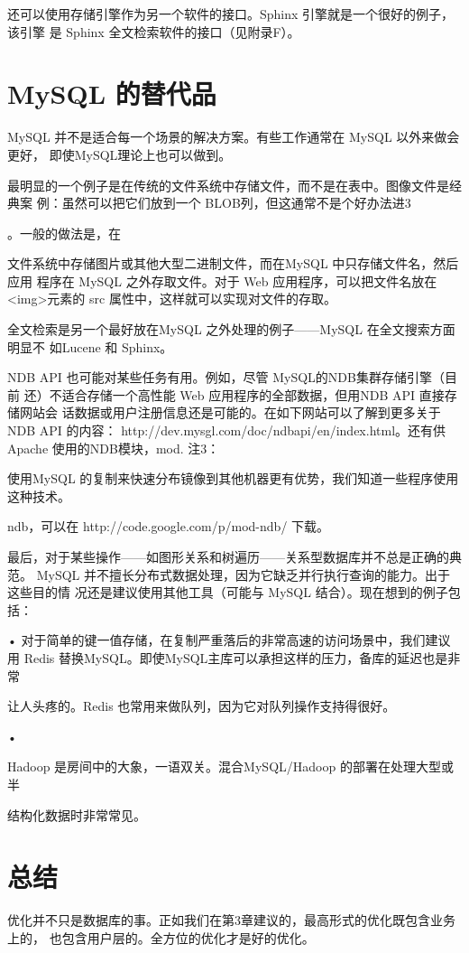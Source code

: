 还可以使用存储引擎作为另一个软件的接口。Sphinx 引擎就是一个很好的例子，该引擎
是 Sphinx 全文检索软件的接口（见附录F）。

\section{MySQL 的替代品}
MySQL 并不是适合每一个场景的解决方案。有些工作通常在 MySQL 以外来做会更好，
即使MySQL理论上也可以做到。

最明显的一个例子是在传统的文件系统中存储文件，而不是在表中。图像文件是经典案
例：虽然可以把它们放到一个 BLOB列，但这通常不是个好办法进3

。一般的做法是，在

文件系统中存储图片或其他大型二进制文件，而在MySQL 中只存储文件名，然后应用
程序在 MySQL 之外存取文件。对于 Web 应用程序，可以把文件名放在<img>元素的
src 属性中，这样就可以实现对文件的存取。

全文检索是另一个最好放在MySQL 之外处理的例子——MySQL 在全文搜索方面明显不
如Lucene 和 Sphinx。

NDB API 也可能对某些任务有用。例如，尽管 MySQL的NDB集群存储引擎（目前
还）不适合存储一个高性能 Web 应用程序的全部数据，但用NDB API 直接存储网站会
话数据或用户注册信息还是可能的。在如下网站可以了解到更多关于 NDB API 的内容：
http://dev.mysgl.com/doc/ndbapi/en/index.html。还有供Apache 使用的NDB模块，mod.
注3：

使用MySQL 的复制来快速分布镜像到其他机器更有优势，我们知道一些程序使用这种技术。

ndb，可以在 http://code.google.com/p/mod-ndb/ 下载。

最后，对于某些操作——如图形关系和树遍历——关系型数据库并不总是正确的典范。
MySQL 并不擅长分布式数据处理，因为它缺乏并行执行查询的能力。出于这些目的情
况还是建议使用其他工具（可能与 MySQL 结合）。现在想到的例子包括：

• 对于简单的键一值存储，在复制严重落后的非常高速的访问场景中，我们建议用
Redis 替换MySQL。即使MySQL主库可以承担这样的压力，备库的延迟也是非常

让人头疼的。Redis 也常用来做队列，因为它对队列操作支持得很好。

•

Hadoop 是房间中的大象，一语双关。混合MySQL/Hadoop 的部署在处理大型或半

结构化数据时非常常见。

\section{总结}
优化并不只是数据库的事。正如我们在第3章建议的，最高形式的优化既包含业务上的，
也包含用户层的。全方位的优化才是好的优化。

